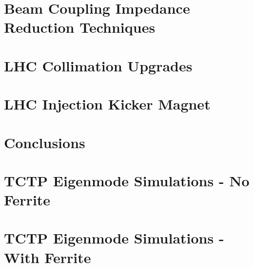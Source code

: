 \documentclass[12pt,PhD]{Thesis}
\begin{document}

\chapter{Beam Coupling Impedance Reduction Techniques}









\chapter{LHC Collimation Upgrades}








\chapter{LHC Injection Kicker Magnet}
\label{chap:mki}










\chapter{Conclusions}





\appendix{}
\chapter{TCTP Eigenmode Simulations - No Ferrite}

\chapter{TCTP Eigenmode Simulations - With Ferrite}

\end{document}
